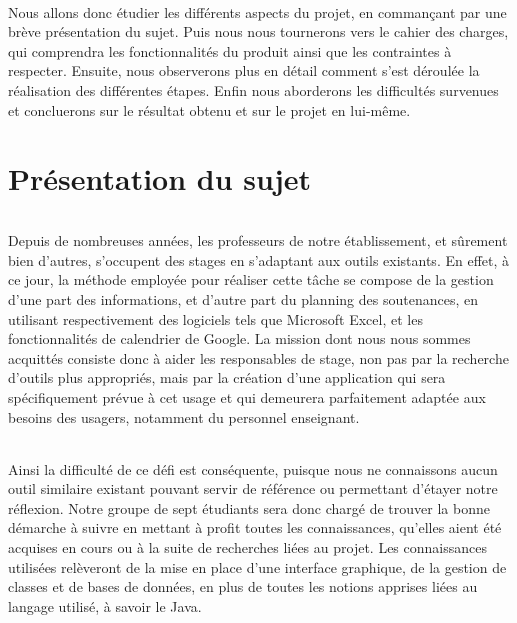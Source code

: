 \documentclass[a4paper,10pt]{report}
\begin{document}
  \paragraph{}
    Nous allons donc étudier les différents aspects du projet, en commançant par une brève présentation du sujet. 
    Puis nous nous tournerons vers le cahier des charges, qui comprendra les fonctionnalités du produit ainsi que les contraintes à respecter.
    Ensuite, nous observerons plus en détail comment s'est déroulée la réalisation des différentes étapes.
    Enfin nous aborderons les difficultés survenues et concluerons sur le résultat obtenu et sur le projet en lui-même.



\part{Présentation du sujet}
  \paragraph{}
    Depuis de nombreuses années, les professeurs de notre établissement, et sûrement bien d'autres, s'occupent des stages en s'adaptant aux outils existants.
    En effet, à ce jour, la méthode employée pour réaliser cette tâche se compose de la gestion d'une part des informations, et d'autre part du planning des soutenances, en utilisant respectivement des logiciels tels que Microsoft Excel, et les fonctionnalités de calendrier de Google.
    La mission dont nous nous sommes acquittés consiste donc à aider les responsables de stage, non pas par la recherche d'outils plus appropriés, mais par la création d'une application qui sera spécifiquement prévue à cet usage et qui demeurera parfaitement adaptée aux besoins des usagers, notamment du personnel enseignant.

  \paragraph{}
    Ainsi la difficulté de ce défi est conséquente, puisque nous ne connaissons aucun outil similaire existant pouvant servir de référence ou permettant d'étayer notre réflexion.
    Notre groupe de sept étudiants sera donc chargé de trouver la bonne démarche à suivre en mettant à profit toutes les connaissances, qu'elles aient été acquises en cours ou à la suite de recherches liées au projet.
    Les connaissances utilisées relèveront de la mise en place d'une interface graphique, de la gestion de classes et de bases de données, en plus de toutes les notions apprises liées au langage utilisé, à savoir le Java.
  
\end{document}
